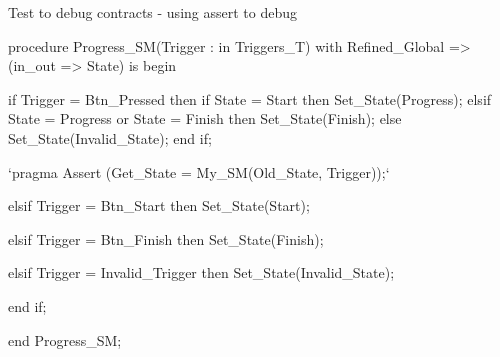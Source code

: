 \documentclass{beamer}
\begin{document}
\begin{frame}[fragile]{Test to debug contracts - using assert to debug}
  \begin{pxcode}[language=SPARK,style=magic,gobble=3]
   procedure Progress_SM(Trigger : in Triggers_T)
     with Refined_Global => (in_out => State)
   is
   begin

      if Trigger = Btn_Pressed then
         if State = Start then
            Set_State(Progress);
         elsif State = Progress or State = Finish then
            Set_State(Finish);
         else
            Set_State(Invalid_State);
         end if;

         `pragma Assert (Get_State = My_SM(Old_State, Trigger));`

      elsif Trigger = Btn_Start then
         Set_State(Start);

      elsif Trigger = Btn_Finish then
         Set_State(Finish);

      elsif Trigger = Invalid_Trigger then
         Set_State(Invalid_State);

      end if;

   end Progress_SM;
  \end{pxcode}
\end{frame}
\end{document}
